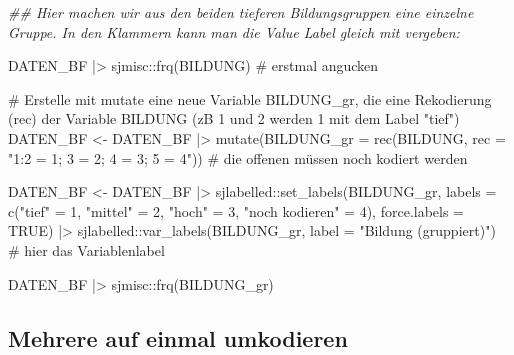\documentclass[twoside, pagesize, fontsize=11pt, dvipsnames]{scrreport}
\newenvironment{Shaded}{\begin{snugshade}}{\end{snugshade}}
\newcommand{\AttributeTok}[1]{\textcolor[rgb]{0.40,0.45,0.13}{#1}}
\newcommand{\CommentTok}[1]{\textcolor[rgb]{0.37,0.37,0.37}{#1}}
\newcommand{\ConstantTok}[1]{\textcolor[rgb]{0.56,0.35,0.01}{#1}}
\newcommand{\DecValTok}[1]{\textcolor[rgb]{0.68,0.00,0.00}{#1}}
\newcommand{\DocumentationTok}[1]{\textcolor[rgb]{0.37,0.37,0.37}{\textit{#1}}}
\newcommand{\FunctionTok}[1]{\textcolor[rgb]{0.28,0.35,0.67}{#1}}
\newcommand{\NormalTok}[1]{\textcolor[rgb]{0.00,0.23,0.31}{#1}}
\newcommand{\OtherTok}[1]{\textcolor[rgb]{0.00,0.23,0.31}{#1}}
\newcommand{\SpecialCharTok}[1]{\textcolor[rgb]{0.37,0.37,0.37}{#1}}
\newcommand{\StringTok}[1]{\textcolor[rgb]{0.13,0.47,0.30}{#1}}
\begin{document}
\begin{Shaded}
\begin{Highlighting}[]
\DocumentationTok{\#\# Hier machen wir aus den beiden tieferen Bildungsgruppen eine einzelne Gruppe. In den Klammern kann man die Value Label gleich mit vergeben:}

\NormalTok{DATEN\_BF }\SpecialCharTok{|\textgreater{}}\NormalTok{ sjmisc}\SpecialCharTok{::}\FunctionTok{frq}\NormalTok{(BILDUNG) }\CommentTok{\# erstmal angucken}

\CommentTok{\# Erstelle mit mutate eine neue Variable BILDUNG\_gr, die eine Rekodierung (rec) der Variable BILDUNG (zB 1 und 2 werden 1 mit dem Label "tief")}
\NormalTok{DATEN\_BF }\OtherTok{\textless{}{-}}\NormalTok{ DATEN\_BF }\SpecialCharTok{|\textgreater{}} 
 \FunctionTok{mutate}\NormalTok{(}\AttributeTok{BILDUNG\_gr =} \FunctionTok{rec}\NormalTok{(BILDUNG, }\AttributeTok{rec =} \StringTok{"1:2 = 1; 3 = 2; 4 = 3; 5 = 4"}\NormalTok{))  }\CommentTok{\# die offenen müssen noch kodiert werden}

\NormalTok{DATEN\_BF }\OtherTok{\textless{}{-}}\NormalTok{ DATEN\_BF }\SpecialCharTok{|\textgreater{}} 
\NormalTok{  sjlabelled}\SpecialCharTok{::}\FunctionTok{set\_labels}\NormalTok{(BILDUNG\_gr, }\AttributeTok{labels =} \FunctionTok{c}\NormalTok{(}\StringTok{"tief"} \OtherTok{=} \DecValTok{1}\NormalTok{, }\StringTok{"mittel"} \OtherTok{=} \DecValTok{2}\NormalTok{, }\StringTok{"hoch"} \OtherTok{=} \DecValTok{3}\NormalTok{, }\StringTok{"noch kodieren"} \OtherTok{=} \DecValTok{4}\NormalTok{), }\AttributeTok{force.labels =} \ConstantTok{TRUE}\NormalTok{) }\SpecialCharTok{|\textgreater{}} 
\NormalTok{  sjlabelled}\SpecialCharTok{::}\FunctionTok{var\_labels}\NormalTok{(BILDUNG\_gr, }\AttributeTok{label =} \StringTok{"Bildung (gruppiert)"}\NormalTok{)  }\CommentTok{\# hier das Variablenlabel}

\NormalTok{DATEN\_BF }\SpecialCharTok{|\textgreater{}} 
\NormalTok{    sjmisc}\SpecialCharTok{::}\FunctionTok{frq}\NormalTok{(BILDUNG\_gr)}
\end{Highlighting}
\end{Shaded}

\hypertarget{mehrere-auf-einmal-umkodieren}{%
\subsection{Mehrere auf einmal
umkodieren}\label{mehrere-auf-einmal-umkodieren}}
\end{document}
